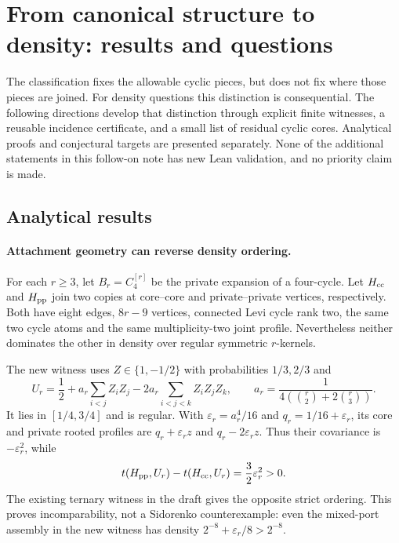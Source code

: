 
\section{From canonical structure to density: results and questions}

The classification fixes the allowable cyclic pieces, but does not fix
where those pieces are joined.  For density questions this distinction
is consequential.  The following directions develop that distinction
through explicit finite witnesses, a reusable incidence certificate, and
a small list of residual cyclic cores.  Analytical proofs and conjectural
targets are presented separately.  None of the additional statements in
this follow-on note has new Lean validation, and no priority claim is made.

\subsection{Analytical results}

\paragraph{Attachment geometry can reverse density ordering.}
For each $r\ge3$, let $B_r=C_4^{[r]}$ be the private expansion of a four-cycle.
Let $H_{\rm cc}$ and $H_{\rm pp}$ join two copies at core--core and
private--private vertices, respectively.  Both have eight edges,
$8r-9$ vertices, connected Levi cycle rank two, the same two cycle atoms
and the same multiplicity-two joint profile.  Nevertheless neither
dominates the other in density over regular symmetric $r$-kernels.

The new witness uses $Z\in\{1,-1/2\}$ with probabilities $1/3,2/3$ and
\[
 U_r=\frac12+a_r\sum_{i<j}Z_iZ_j
                  -2a_r\sum_{i<j<k}Z_iZ_jZ_k,
 \qquad
 a_r=\frac1{4(\binom r2+2\binom r3)}.
\]
It lies in $[1/4,3/4]$ and is regular.  With
$\varepsilon_r=a_r^4/16$ and $q_r=1/16+\varepsilon_r$, its core and
private rooted profiles are $q_r+\varepsilon_rz$ and
$q_r-2\varepsilon_rz$.  Thus their covariance is
$-\varepsilon_r^2$, while
\[
 t(H_{\rm pp},U_r)-t(H_{\rm cc},U_r)
       =\frac32\varepsilon_r^2>0.
\]
The existing ternary witness in the draft gives the opposite strict
ordering.  This proves incomparability, not a Sidorenko counterexample:
even the mixed-port assembly in the new witness has density
$2^{-8}+\varepsilon_r/8>2^{-8}$.

